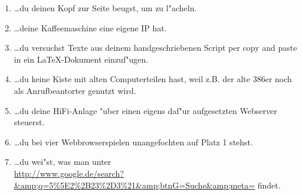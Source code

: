\begin{enumerate}
\item \ldots du deinen Kopf zur Seite beugst, um zu l"acheln.
\item \ldots deine Kaffeemaschine eine eigene IP hat.
\item \ldots du versuchst Texte aus deinem handgeschriebenen Script per copy and paste in ein \LaTeX-Dokument einzuf"ugen.
\item \ldots du keine Kiste mit alten Computerteilen hast, weil z.B. der alte 386er noch als Anrufbeantorter genutzt wird.
\item \ldots du deine HiFi-Anlage "uber einen eigens daf"ur aufgesetzten Webserver steuerst.
\item \ldots du bei vier Webbrowserspielen unangefochten auf Platz 1 stehst.
\item \ldots du wei"st, was man unter\\ \url{http://www.google.de/search?&amp;q=5\%5E2\%2B23\%2D3\%21&amp;btnG=Suche&amp;meta=} findet.
\end{enumerate}
